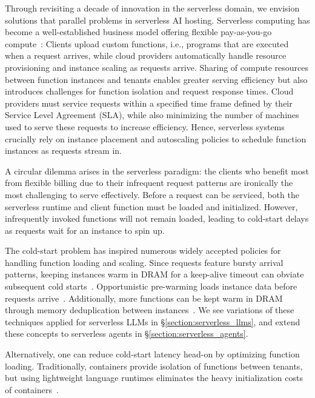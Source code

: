 Through revisiting a decade of innovation in the serverless domain, we envision solutions that parallel problems in serverless AI hosting. 
Serverless computing has become a well-established business model offering flexible pay-as-you-go compute~\cite{kounev2023serverless, googlecloudfunctions, azurefunctions, openwhisk, firecracker}:
Clients upload custom functions, i.e., programs that are executed when a request arrives, while cloud providers automatically handle resource provisioning and instance scaling as requests arrive.
Sharing of compute resources between function instances and tenants enables greater serving efficiency but also introduces challenges for function isolation and request response times.
Cloud providers must service requests within a specified time frame defined by their Service Level Agreement (SLA), while also minimizing the number of machines used to serve these requests to increase efficiency.
Hence, serverless systems crucially rely on instance placement and autoscaling policies to schedule function instances as requests stream in.

A circular dilemma arises in the serverless paradigm: the clients who benefit most from flexible billing due to their infrequent request patterns are ironically the most challenging to serve effectively.
Before a request can be serviced, both the serverless runtime and client function must be loaded and initialized.
However, infrequently invoked functions will not remain loaded, leading to cold-start delays as requests wait for an instance to spin up.

The cold-start problem has inspired numerous widely accepted policies for handling function loading and scaling.
Since requests feature bursty arrival patterns, keeping instances warm in DRAM for a keep-alive timeout can obviate subsequent cold starts~\cite{lambda, faascache}.
Opportunistic pre-warming loads instance data before requests arrive~\cite{recycle-containers, prewarm-not-enough}.
Additionally, more functions can be kept warm in DRAM through memory deduplication between instances~\cite{lambda, medes, qiu2023userguidedpagemergingmemory}.
We see variations of these techniques applied for serverless LLMs in \S\ref{section:serverless_llms}, and extend these concepts to serverless agents in \S\ref{section:serverless_agents}.

Alternatively, one can reduce cold-start latency head-on by optimizing function loading.
Traditionally, containers provide isolation of functions between tenants, but using lightweight language runtimes eliminates the heavy initialization costs of containers~\cite{virtines, catalyzer}.

